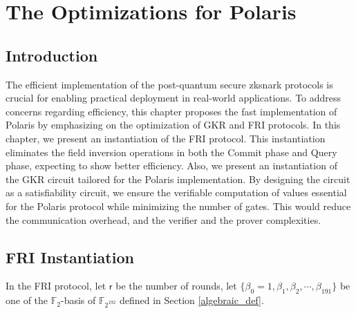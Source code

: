 \chapter{The Optimizations for Polaris}

\section{Introduction}
The efficient implementation of the  post-quantum secure \gls{zksnark} protocols is crucial for enabling practical deployment in real-world applications. To address concerns regarding efficiency, this chapter proposes the fast implementation of Polaris by emphasizing on the optimization of GKR and FRI protocols.  In this chapter, we present an instantiation of the FRI protocol. This instantiation eliminates the field inversion operations in both the Commit phase and Query phase, expecting to show  better efficiency. Also, we present an instantiation of the GKR circuit tailored for the Polaris implementation. By designing the circuit as a  satisfiability circuit, we ensure the verifiable computation of values essential for the Polaris protocol while minimizing the number of gates. This would reduce the communication overhead, and the verifier and the prover complexities.

\section{FRI Instantiation}
\label{sec:FRI_instantiation}

In the FRI protocol, let $\mathsf{r}$ be the number of rounds, let $\{\beta_0 = 1, \beta_1, \beta_2,\cdots, \beta_{191}\}$ be one of the $\mathbb{F}_2$-basis of $\mathbb{F}_{2^{192}}$ defined in Section \ref{algebraic_def}.
\newline

